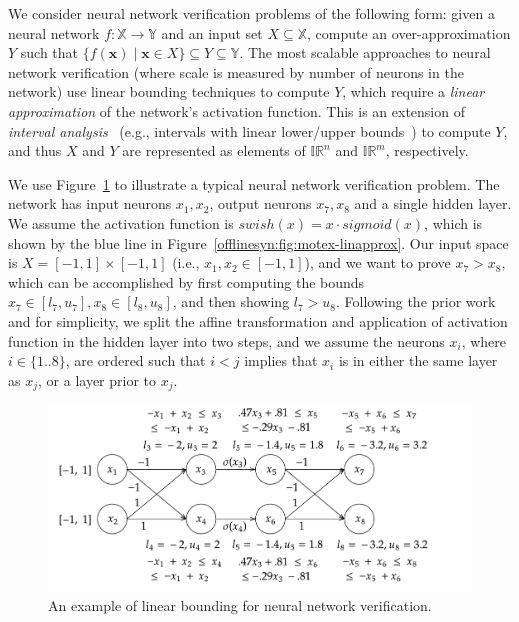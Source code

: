 We consider neural network verification problems of the following form: given a neural
network $ f : \mathbb{X} \to \mathbb{Y} $ and an input set $ X \subseteq
\mathbb{X} $, compute an over-approximation $ Y $ such that $ \{f(\mathbf{x}) \mid
\mathbf{x} \in X \} \subseteq Y \subseteq \mathbb{Y} $.
%
The most scalable approaches to neural network verification
(where scale is measured by number of neurons in the network)
 use linear bounding techniques to compute
$ Y $, which require a \textit{linear approximation} of the network's
activation function.
%
This is an extension of \textit{interval
analysis}~\cite{moore2009introduction} (e.g., intervals with linear
lower/upper bounds~\cite{SinghGPV19,autolipra}) to compute $ Y $, and thus
$ X $ and $ Y $ are represented as elements of $
\mathbb{IR}^n $ and $ \mathbb{IR}^m $, respectively.

We use Figure~\ref{offlinesyn:fig:motex} to illustrate a typical neural network
verification problem.
The network has input neurons $ x_1, x_2 $,
output neurons $ x_7, x_8 $ and a single hidden layer. We assume the activation
function is $ swish(x) = x \cdot sigmoid(x) $, which is shown by the blue line
in Figure~\ref{offlinesyn:fig:motex-linapprox}. Our input space is $ X = [-1, 1]
\times
[-1, 1] $ (i.e., $ x_1, x_2 \in [-1, 1] $), and we want to prove  $
x_7 > x_8 $, which can be accomplished by first computing the bounds $ x_7 \in [l_7, u_7],
x_8 \in [l_8, u_8] $, and then showing $ l_7 > u_8 $. Following the prior
work~\cite{SinghGPV19} and for simplicity, we split the affine transformation
and application of activation function in the hidden layer into two steps, and we assume the
neurons $ x_i$, where $i \in \{1..8\} $, are ordered such that $ i < j $ implies that $
x_i $ is in either the same layer as $ x_j $, or a layer prior to $ x_j $.

\begin{figure}[t]
\centering
\includegraphics[width=0.9\linewidth]{offlinesyn/figs/motex.pdf}
\caption{An example of linear bounding for neural network verification.
\label{offlinesyn:fig:motex}}
\end{figure}

